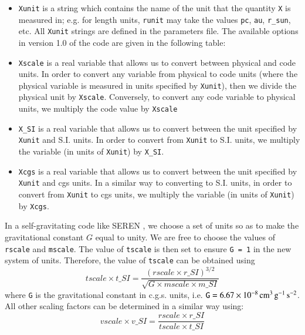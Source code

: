 \documentclass[a4paper]{article}
\newcommand{\NAME}{SEREN }
\newcommand{\var}[1]{\texttt{#1}}
\begin{document}
\begin{itemize}
\item \var{Xunit} is a string which contains the name of the unit that the quantity \var{X} is measured in; e.g. for length units, \var{runit} may take the values \var{pc}, \var{au}, \var{r\_sun}, etc.   All \var{Xunit} strings are defined in the parameters file.  The available options in version 1.0 of the code are given in the following table: 

\item \var{Xscale} is a real variable that allows us to convert between physical and code units.  In order to convert any variable from physical to code units (where the physical variable is measured in units specified by \var{Xunit}), then we divide the physical unit by \var{Xscale}.  Conversely, to convert any code variable to physical units, we multiply the code value by \var{Xscale}
\item \var{X\_SI} is a real variable that allows us to convert between the unit specified by \var{Xunit} and S.I. units.  In order to convert from \var{Xunit} to S.I. units, we multiply the variable (in units of \var{Xunit}) by \var{X\_SI}.
\item \var{Xcgs} is a real variable that allows us to convert between the unit specified by \var{Xunit} and cgs units.  In a similar way to converting to S.I. units, in order to convert from \var{Xunit} to cgs units, we multiply the variable (in units of \var{Xunit}) by \var{Xcgs}.
\end{itemize}


In a self-gravitating code like \NAME, we choose a set of units so as to make the gravitational constant $G$ equal to unity.   We are free to choose the values of \var{rscale} and \var{mscale}.  The value of \var{tscale} is then set to ensure \var{G = 1} in the new system of units.  Therefore, the value of \var{tscale} can be obtained using 
\begin{equation}
tscale \times t\_SI = \frac{\left( rscale \times r\_SI \right)^{3/2}} 
{\sqrt{G \times mscale \times m\_SI}}
\end{equation}
where \var{G} is the gravitational constant in c.g.s. units, i.e. $\var{G} = 6.67 \times 10^{-8} \, {\rm cm}^3\,{\rm g}^{-1}\,{\rm s}^{-2}$.  All other scaling factors can be determined in a similar way using: 
\begin{equation}
vscale \times v\_SI = \frac{rscale \times r\_SI} {tscale \times t\_SI}
\end{equation}
\end{document}
